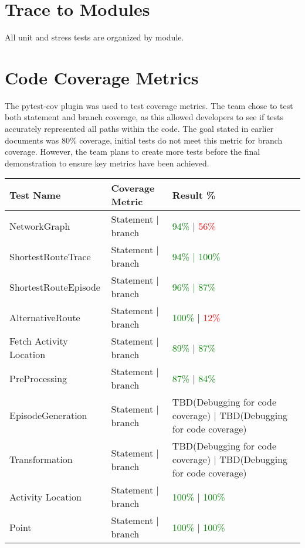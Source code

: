 \documentclass[12pt, titlepage]{article}
\begin{document}
\section{Trace to Modules}
All unit and stress tests are organized by module. 

\newpage
\section{Code Coverage Metrics}

The pytest-cov plugin was used to test coverage metrics. The team chose to test both statement and branch coverage, as this allowed developers to see if tests accurately represented all paths within the code. The goal stated in earlier documents was 80\% coverage, initial tests do not meet this metric for branch coverage. However, the team plans to create more tests before the final demonstration to ensure key metrics have been achieved.\\

\begin{tabular}{ | m{5cm} | m{4cm}| m{4cm} | }
  \hline
  \textbf{Test Name} & \textbf{Coverage Metric} & \textbf{Result \%} \\ 
  \hline
  NetworkGraph & Statement | branch & \textcolor{green}{94\%} | \textcolor{red}{56\%} \\ 
  \hline
  ShortestRouteTrace & Statement | branch & \textcolor{green}{94\% | 100\%} \\ 
  \hline
  ShortestRouteEpisode & Statement | branch & \textcolor{green}{96\% | 87\%} \\
  \hline
  AlternativeRoute & Statement | branch & \textcolor{green}{100\%} | \textcolor{red}{12\%} \\
  \hline
  Fetch Activity Location & Statement | branch & \textcolor{green}{89\%} | \textcolor{green}{87\%} \\
  \hline
  PreProcessing & Statement | branch & \textcolor{green}{87\%} | \textcolor{green}{84\%} \\
  \hline
    EpisodeGeneration & Statement | branch & TBD(Debugging for code coverage) | TBD(Debugging for code coverage)\\
  \hline
    Transformation & Statement | branch & TBD(Debugging for code coverage) | TBD(Debugging for code coverage)\\
  \hline
  Activity Location & Statement | branch & \textcolor{green}{100\%} | \textcolor{green}{100\%} \\
  \hline
  Point & Statement | branch & \textcolor{green}{100\%} | \textcolor{green}{100\%} \\
  \hline
\end{tabular}




\end{document}
